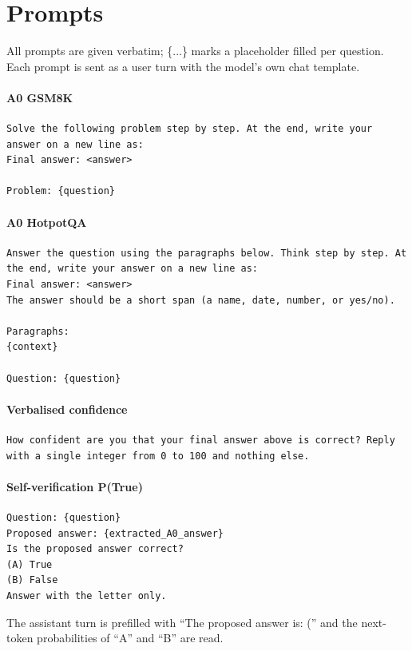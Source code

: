 \section{Prompts}
\label{app:prompts}
All prompts are given verbatim; \{...\} marks a placeholder filled per question. Each prompt is sent as a user turn with the model's own chat template.

\paragraph{A0 GSM8K}\mbox{}\par\nopagebreak
\begin{lstlisting}
Solve the following problem step by step. At the end, write your answer on a new line as:
Final answer: <answer>

Problem: {question}
\end{lstlisting}

\paragraph{A0 HotpotQA}\mbox{}\par\nopagebreak
\begin{lstlisting}
Answer the question using the paragraphs below. Think step by step. At the end, write your answer on a new line as:
Final answer: <answer>
The answer should be a short span (a name, date, number, or yes/no).

Paragraphs:
{context}

Question: {question}
\end{lstlisting}

\paragraph{Verbalised confidence}\mbox{}\par\nopagebreak
\begin{lstlisting}
How confident are you that your final answer above is correct? Reply with a single integer from 0 to 100 and nothing else.
\end{lstlisting}

\paragraph{Self-verification P(True)}\mbox{}\par\nopagebreak
\begin{lstlisting}
Question: {question}
Proposed answer: {extracted_A0_answer}
Is the proposed answer correct?
(A) True
(B) False
Answer with the letter only.
\end{lstlisting}
The assistant turn is prefilled with ``The proposed answer is: ('' and the next-token probabilities of ``A'' and ``B'' are read.

